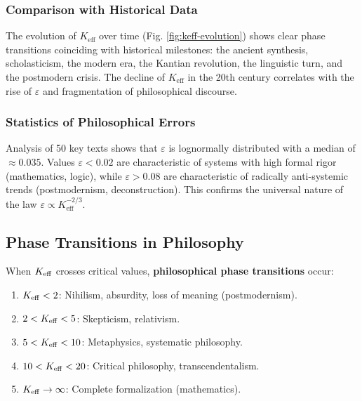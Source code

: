 \documentclass[12pt,a4paper]{article}
\newcommand{\eps}{\varepsilon}
\begin{document}
	\subsubsection{Comparison with Historical Data}
	
	The evolution of \(K_{\mathrm{eff}}\) over time (Fig. \ref{fig:keff-evolution}) shows clear phase transitions coinciding with historical milestones: the ancient synthesis, scholasticism, the modern era, the Kantian revolution, the linguistic turn, and the postmodern crisis. The decline of \(K_{\mathrm{eff}}\) in the 20th century correlates with the rise of \(\eps\) and fragmentation of philosophical discourse.
	
	\subsubsection{Statistics of Philosophical Errors}
	
	Analysis of 50 key texts shows that \(\eps\) is lognormally distributed with a median of \(\approx 0.035\). Values \(\eps < 0.02\) are characteristic of systems with high formal rigor (mathematics, logic), while \(\eps > 0.08\) are characteristic of radically anti-systemic trends (postmodernism, deconstruction). This confirms the universal nature of the law \(\eps \propto K_{\mathrm{eff}}^{-2/3}\).
	
	\subsection{Phase Transitions in Philosophy}
	
	When \(\Keff\) crosses critical values, \textbf{philosophical phase transitions} occur:
	
	\begin{enumerate}
		\item \(\Keff < 2\): Nihilism, absurdity, loss of meaning (postmodernism).
		\item \(2 < \Keff < 5\): Skepticism, relativism.
		\item \(5 < \Keff < 10\): Metaphysics, systematic philosophy.
		\item \(10 < \Keff < 20\): Critical philosophy, transcendentalism.
		\item \(\Keff \to \infty\): Complete formalization (mathematics).
	\end{enumerate}
	
\end{document}

